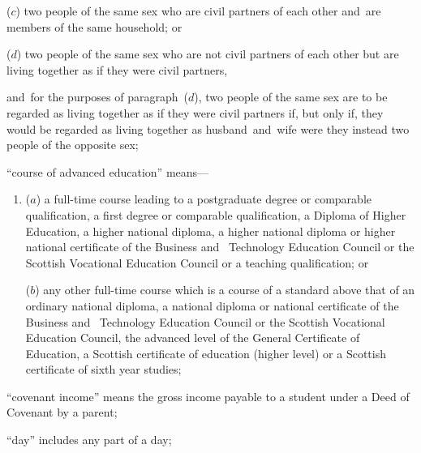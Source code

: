 \documentclass[12pt,a4paper]{article}
\begin{document}
\begin{enumerate}
\begin{enumerate}
($c$) 
two people of the same sex who are civil partners of each other and~are members of the same household; or

($d$) 
two people of the same sex who are not civil partners of each other but are living together as if they were civil partners,
\end{enumerate}
and~for the purposes of paragraph~($d$), two people of the same sex are to be regarded as living together as if they were civil partners if, but only if, they would be regarded as living together as husband~and~wife were they instead two people of the opposite sex;

“course of advanced education” means---
\begin{enumerate}\item[]
($a$)
a full-time course leading to a postgraduate degree or comparable qualification, a first degree or comparable qualification, a Diploma of Higher Education, a higher national diploma, a higher national diploma or higher national certificate of the Business and~
Technology %
Education Council or the Scottish Vocational Education Council or a teaching qualification; or

($b$)
any other full-time course which is a course of a standard above that of an ordinary national diploma, a national diploma or national certificate of the Business and~
Technology %
Education Council or the Scottish Vocational Education Council, the advanced level of the General Certificate of Education, a Scottish certificate of education (higher level) or a Scottish certificate of sixth year studies;
\end{enumerate}

“covenant income” means the gross income payable to a student under a Deed of Covenant by a parent;

“day” includes any part of a day;

%


\end{enumerate}
\end{document}
